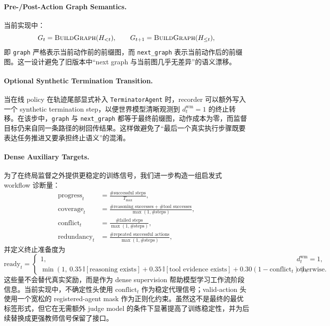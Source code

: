 \paragraph{Pre-/Post-Action Graph Semantics.}
当前实现中：
\begin{equation}
    G_t = \textsc{BuildGraph}(H_{<t}), \qquad
    G_{t+1} = \textsc{BuildGraph}(H_{\le t}),
\end{equation}
即 \texttt{graph} 严格表示当前动作前的前缀图，而 \texttt{next\_graph} 表示当前动作后的前缀图。这一设计避免了旧版本中“next graph 与当前图几乎无差异”的语义漂移。

\paragraph{Optional Synthetic Termination Transition.}
当在线 policy 在轨迹尾部显式补入 \texttt{TerminatorAgent} 时，recorder 可以额外写入一个 synthetic termination step，以便世界模型清晰观测到 $d_t^{\text{wm}}=1$ 的终止转移。在该步中，\texttt{graph} 与 \texttt{next\_graph} 都等于最终前缀图，动作成本为零，而监督目标仍来自同一条路径的树回传结果。这样做避免了“最后一个真实执行步骤既要表达任务推进又要承担终止语义”的混淆。

\paragraph{Dense Auxiliary Targets.}
为了在终局监督之外提供更稳定的训练信号，我们进一步构造一组启发式 workflow 诊断量：
\begin{align}
    \mathrm{progress}_t &= \frac{\#\text{successful steps}}{T_{\max}},\\
    \mathrm{coverage}_t &= \frac{\#\text{reasoning successes}+\#\text{tool successes}}{\max(1,\#\text{steps})},\\
    \mathrm{conflict}_t &= \frac{\#\text{failed steps}}{\max(1,\#\text{steps})},\\
    \mathrm{redundancy}_t &= \frac{\#\text{repeated successful actions}}{\max(1,\#\text{steps})},
\end{align}
并定义终止准备度为
\begin{equation}
    \mathrm{ready}_t =
    \begin{cases}
        1, & d_t^{\text{wm}}=1,\\
        \min\left(1,\ 0.35\,\mathbb{I}[\text{reasoning exists}] + 0.35\,\mathbb{I}[\text{tool evidence exists}] + 0.30(1-\mathrm{conflict}_t)\right), & \text{otherwise}.
    \end{cases}
\end{equation}
这些量不会替代真实奖励，而是作为 dense supervision 帮助模型学习工作流阶段信息。当前实现中，不确定性头使用 $\mathrm{conflict}_t$ 作为稳定代理信号；valid-action 头使用一个宽松的 registered-agent mask 作为正则化约束。虽然这不是最终的最优标签形式，但它在无需额外 judge model 的条件下显著提高了训练稳定性，并为后续替换成更强教师信号保留了接口。


